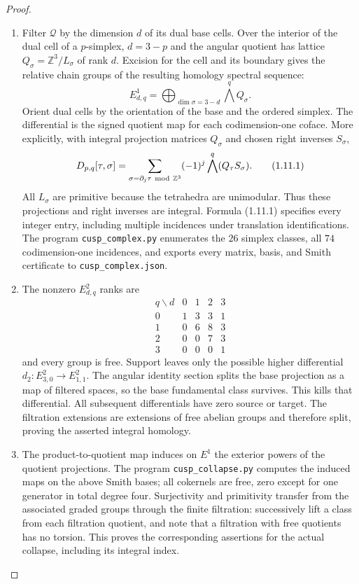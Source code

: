 \documentclass[11pt,a4paper]{article}
\theoremstyle{definition}
\begin{document}
\begin{proof}
\begin{enumerate}[label=\arabic*.]
\item Filter $\mathcal Q$ by the dimension $d$ of its dual base cells.
Over the interior of the dual cell of a $p$-simplex, $d=3-p$ and the
angular quotient has lattice
$Q_\sigma=\mathbb Z^3/L_\sigma$ of rank $d$.
Excision for the cell and its boundary gives the relative chain
groups of the resulting homology spectral sequence:
\[
E^1_{d,q}=\bigoplus_{\dim\sigma=3-d}\bigwedge^qQ_\sigma.
\]
Orient dual cells by the orientation of the base and the ordered
simplex.  The differential is the signed quotient map for each
codimension-one coface.  More explicitly, with integral projection
matrices $Q_\sigma$ and chosen right inverses $S_\sigma$,
\[
D_{p,q}[\tau,\sigma]=
 \sum_{\sigma=\partial_j\tau\ {\rm mod}\ \mathbb Z^3}
 (-1)^j\bigwedge^q(Q_\tau S_\sigma).
\tag{1.11.1}
\]
All $L_\sigma$ are primitive because the tetrahedra are unimodular.
Thus these projections and right inverses are integral.  Formula
(1.11.1) specifies every integer entry, including multiple incidences
under translation identifications.  The program
\texttt{cusp\_complex.py} enumerates the $26$ simplex classes, all
$74$ codimension-one incidences, and exports every matrix, basis, and
Smith certificate to \texttt{cusp\_complex.json}.

\item The nonzero $E^2_{d,q}$ ranks are
\[
\begin{array}{c|rrrr}
q\backslash d&0&1&2&3\\\hline
0&1&3&3&1\\
1&0&6&8&3\\
2&0&0&7&3\\
3&0&0&0&1
\end{array}
\]
and every group is free.  Support leaves only the possible higher
differential $d_2:E^2_{3,0}\to E^2_{1,1}$.
The angular identity section splits the base projection as a map of
filtered spaces, so the base fundamental class survives.  This kills
that differential.  All subsequent differentials have zero source or
target.  The filtration extensions are extensions of free abelian
groups and therefore split, proving the asserted integral homology.

\item The product-to-quotient map induces on $E^1$ the exterior powers of
the quotient projections.  The program \texttt{cusp\_collapse.py}
computes the induced maps on the above Smith bases; all cokernels are
free, zero except for one generator in total degree four.
Surjectivity and primitivity transfer from the associated graded
groups through the finite filtration: successively lift a class from
each filtration quotient, and note that a filtration with free
quotients has no torsion.  This proves the corresponding assertions
for the actual collapse, including its integral index.


\end{enumerate}
\end{proof}
\end{document}
